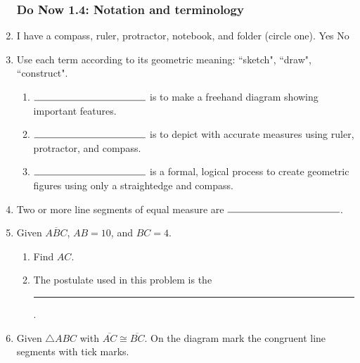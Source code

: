 \documentclass[12pt, twoside]{article}
\begin{document}
\begin{enumerate}
\newpage
\subsubsection*{Do Now 1.4: Notation and terminology} %
\item I have a compass, ruler, protractor, notebook, and folder (circle one). Yes \qquad No

\item Use each term according to its geometric meaning: ``sketch", ``draw", ``construct".
    \begin{enumerate}
      \item $\rule{4cm}{0.15mm}$ is to make a freehand diagram showing important features. \smallskip
      \item $\rule{4cm}{0.15mm}$ is to depict with accurate measures using ruler, protractor, and compass. \smallskip
      \item $\rule{4cm}{0.15mm}$ is a formal, logical process to create geometric figures using only a straightedge and compass.
    \end{enumerate} \smallskip

\item Two or more line segments of equal measure are $\rule{4cm}{0.15mm}$.
    \bigskip
\item Given $\overline{ABC}$, $AB=10$, and $BC=4$.
  \begin{enumerate}
    \item Find ${AC}$.\\[0.75cm]
       \smallskip
    \item The postulate used in this problem is the \rule{6cm}{0.15mm}.
  \end{enumerate}
  \smallskip

\item Given $\triangle ABC$ with $\overline{AC} \cong \overline{BC}$. On the diagram mark the congruent line segments with tick marks.
  \begin{center}
  \end{center}


\end{enumerate}
\end{document}
